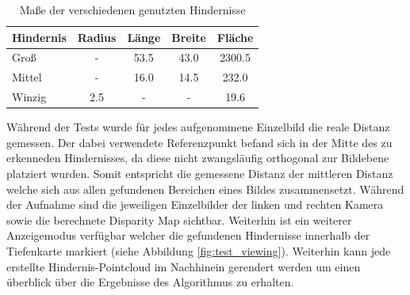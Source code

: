 	\begin{table}[h]
	\centering
	\begin{tabular}{|l|c|c|c|c|}
	\hline
	Hindernis   & Radius & Länge & Breite & Fläche \\
	\hline
	Groß   		&   -    & 53.5  & 43.0   & 2300.5 \\
	\hline
	Mittel 		& 	-    & 16.0  & 14.5   & 232.0\\
	\hline
	Winzig		& 2.5	 &   -   &   -    & 19.6 \\
	\hline	
	\end{tabular}
	\label{tbl:obstacle_sizes}
	\caption{Maße der verschiedenen genutzten Hindernisse}
	\end{table}
	
	\noindent
	Während der Tests wurde für jedes aufgenommene Einzelbild die reale Distanz gemessen. Der dabei verwendete Referenzpunkt befand sich in der Mitte des zu erkenneden Hindernisses, da diese nicht zwangsläufig orthogonal zur Bildebene platziert wurden. Somit entspricht die gemessene Distanz der mittleren Distanz welche sich aus allen gefundenen Bereichen eines Bildes zusammensetzt. Während der Aufnahme sind die jeweiligen Einzelbilder der linken und rechten Kamera sowie die berechnete Disparity Map sichtbar. Weiterhin ist ein weiterer Anzeigemodus verfügbar welcher die gefundenen Hindernisse innerhalb der Tiefenkarte markiert (siehe Abbildung \ref{fig:test_viewing}). Weiterhin kann jede erstellte Hindernis-Pointcloud im Nachhinein gerendert werden um einen überblick über die Ergebnisse des Algorithmus zu erhalten.\\
	
